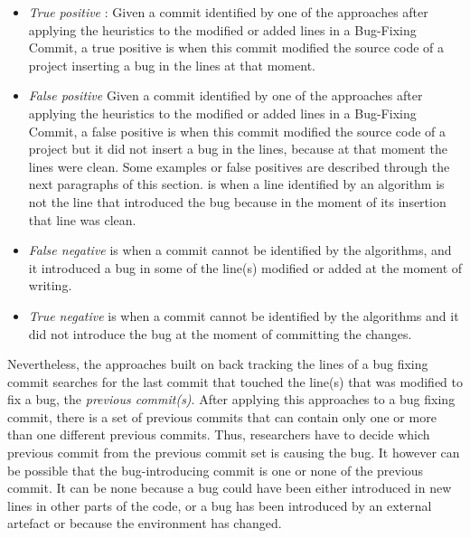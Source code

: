 \documentclass[a4paper, 12pt]{book}
\begin{document}
\begin{itemize}
  \item \emph{True positive} : Given a commit identified by one of the approaches after applying the heuristics to the modified or added lines in a Bug-Fixing Commit, a true positive is when this commit modified the source code of a project inserting a bug in the lines at that moment. 
  \item \emph{False positive}  Given a commit identified by one of the approaches after applying the heuristics to the modified or added lines in a Bug-Fixing Commit, a false positive is when this commit modified the source code of a project but it did not insert a bug in the lines, because at that moment the lines were clean. Some examples or false positives are described through the next paragraphs of  this section.
  is when a line identified by an algorithm is not the line that introduced the bug because in the moment of its insertion that line was clean. 
   \item \emph{False negative}  is when a commit cannot be identified by the algorithms, and it introduced a bug in some of the line(s) modified or added at the moment of writing.
  \item \emph{True negative} is when a commit cannot be identified by the algorithms and it did not introduce the bug at the moment of committing the changes.
\end{itemize}

Nevertheless, the approaches built on back tracking the lines of a bug fixing commit searches for the last commit that touched the line(s) that was modified to fix a bug, the \emph{previous commit(s)}. After applying this approaches to a bug fixing commit, there is a set of previous commits that can contain only one or more than one different previous commits. Thus, researchers have to decide which previous commit from the previous commit set is causing the bug. It however can be possible that the bug-introducing commit is one or none of the previous commit. It can be none because a bug could have been either introduced in new lines in other parts of the code, or a bug has been introduced by an external artefact or because the environment has changed.
\end{document}

